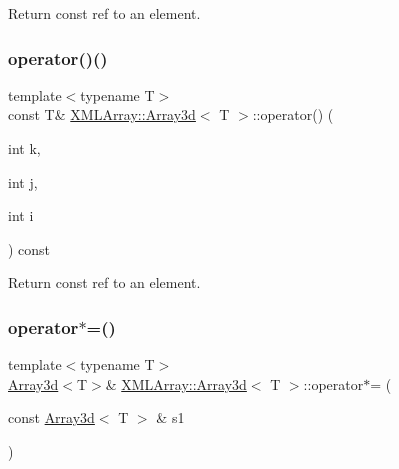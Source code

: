 Return const ref to an element. 

\mbox{\label{classXMLArray_1_1Array3d_a177102edcf9ac47e8dbf50311d9e5549}} 
\subsubsection{\texorpdfstring{operator()()}{operator()()}\hspace{0.1cm}{\footnotesize\ttfamily [4/4]}}
{\footnotesize\ttfamily template$<$typename T$>$ \\
const T\& \mbox{\hyperlink{classXMLArray_1_1Array3d}{X\+M\+L\+Array\+::\+Array3d}}$<$ T $>$\+::operator() (\begin{DoxyParamCaption}\item[{int}]{k,  }\item[{int}]{j,  }\item[{int}]{i }\end{DoxyParamCaption}) const\hspace{0.3cm}{\ttfamily [inline]}}



Return const ref to an element. 

\mbox{\label{classXMLArray_1_1Array3d_a8084893bc2fd7c37f656d6eec21189eb}} 
\subsubsection{\texorpdfstring{operator$\ast$=()}{operator*=()}\hspace{0.1cm}{\footnotesize\ttfamily [1/4]}}
{\footnotesize\ttfamily template$<$typename T$>$ \\
\mbox{\hyperlink{classXMLArray_1_1Array3d}{Array3d}}$<$T$>$\& \mbox{\hyperlink{classXMLArray_1_1Array3d}{X\+M\+L\+Array\+::\+Array3d}}$<$ T $>$\+::operator$\ast$= (\begin{DoxyParamCaption}\item[{const \mbox{\hyperlink{classXMLArray_1_1Array3d}{Array3d}}$<$ T $>$ \&}]{s1 }\end{DoxyParamCaption})\hspace{0.3cm}{\ttfamily [inline]}}



